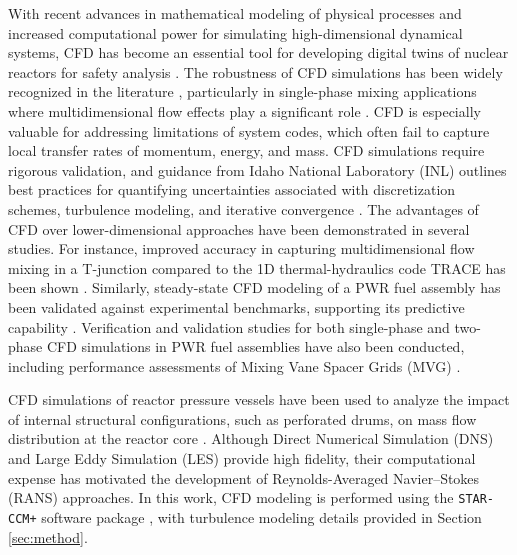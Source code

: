\documentclass[review]{elsarticle}
\theoremstyle{definition}
\theoremstyle{definition}
\theoremstyle{remark}
\begin{document}
With recent advances in mathematical modeling of physical processes and increased computational power for simulating high-dimensional dynamical systems, CFD has become an essential tool for developing digital twins of nuclear reactors for safety analysis \cite{liao2024cfd, wang2021recent}. The robustness of CFD simulations has been widely recognized in the literature \cite{hohne2010application}, particularly in single-phase mixing applications where multidimensional flow effects play a significant role \cite{SwirlManera}. CFD is especially valuable for addressing limitations of system codes, which often fail to capture local transfer rates of momentum, energy, and mass. CFD simulations require rigorous validation, and guidance from Idaho National Laboratory (INL) outlines best practices for quantifying uncertainties associated with discretization schemes, turbulence modeling, and iterative convergence \cite{johnson2006processes}. The advantages of CFD over lower-dimensional approaches have been demonstrated in several studies. For instance, improved accuracy in capturing multidimensional flow mixing in a T-junction compared to the 1D thermal-hydraulics code TRACE has been shown \cite{bertolotto2009single}. Similarly, steady-state CFD modeling of a PWR fuel assembly has been validated against experimental benchmarks, supporting its predictive capability \cite{conner2010cfd}. Verification and validation studies for both single-phase and two-phase CFD simulations in PWR fuel assemblies have also been conducted, including performance assessments of Mixing Vane Spacer Grids (MVG) \cite{han2022verification}.

CFD simulations of reactor pressure vessels have been used to analyze the impact of internal structural configurations, such as perforated drums, on mass flow distribution at the reactor core \cite{wang2020cfd}. Although Direct Numerical Simulation (DNS) and Large Eddy Simulation (LES) provide high fidelity, their computational expense has motivated the development of Reynolds-Averaged Navier–Stokes (RANS) approaches. In this work, CFD modeling is performed using the \texttt{STAR-CCM+} software package \cite{starccm}, with turbulence modeling details provided in Section \ref{sec:method}.

\end{document}
